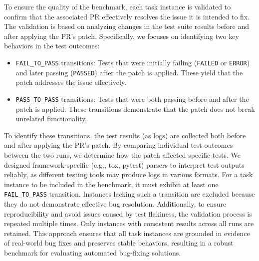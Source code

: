 To ensure the quality of the benchmark, each task instance is validated to confirm that the associated PR effectively resolves the issue it is intended to fix. The validation is based on analyzing changes in the test suite results before and after applying the PR's patch.
Specifically, we focuses on identifying two key behaviors in the test outcomes:
\begin{itemize}[leftmargin=*]
    \item \texttt{FAIL\_TO\_PASS} transitions: Tests that were initially failing (\texttt{FAILED} or \texttt{ERROR}) and later passing (\texttt{PASSED}) after the patch is applied. These yield that the patch addresses the issue effectively.
    \item \texttt{PASS\_TO\_PASS} transitions: Tests that were both passing before and after the patch is applied. These transitions demonstrate that the patch does not break unrelated functionality.
\end{itemize}
To identify these transitions, the test results (as logs) are collected both before and after applying the PR's patch. By comparing individual test outcomes between the two runs, we determine how the patch affected specific tests. We designed framework-specific (e.g., tox, pytest) parsers to interpret test outputs reliably, as different testing tools may produce logs in various formats.
For a task instance to be included in the benchmark, it must exhibit at least one \texttt{FAIL\_TO\_PASS} transition. Instances lacking such a transition are excluded because they do not demonstrate effective bug resolution. Additionally, to ensure reproducibility and avoid issues caused by test flakiness, the validation process is repeated multiple times. Only instances with consistent results across all runs are retained.
This approach ensures that all task instances are grounded in evidence of real-world bug fixes and preserves stable behaviors, resulting in a robust  benchmark for evaluating automated bug-fixing solutions.


